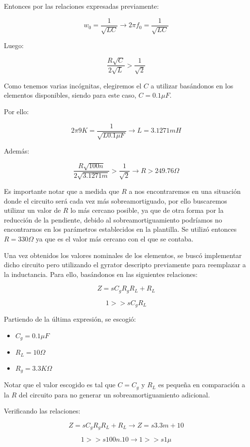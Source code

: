 Entonces por las relaciones expresadas previamente:

$$w_0=\frac{1}{\sqrt{LC}} \longrightarrow 2\pi f_0=\frac{1}{\sqrt{LC}}$$

Luego:

$$\frac{R\sqrt{C}}{2\sqrt{L}} > \frac{1}{\sqrt{2}}$$

Como tenemos varias incógnitas, elegiremos el $C$ a utilizar basándonos en los elementos disponibles, siendo para este caso,
$C=0.1\mu F$. 

Por ello:

$$2\pi 9K=\frac{1}{\sqrt{L0.1 \mu F}} \longrightarrow L = 3.1271 mH$$

Además:

$$\frac{R\sqrt{100n}}{2\sqrt{3.1271m}} > \frac{1}{\sqrt{2}} \longrightarrow R > 249.76 \Omega $$

Es importante notar que a medida que $R$ a nos encontraremos en una situación donde el circuito será
cada vez más sobreamortiguado, por ello buscaremos utilizar un valor de $R$ lo más cercano posible, ya que de otra forma
por la reducción de la pendiente, debido al sobreamortiguamiento podríamos no encontrarnos en los parámetros establecidos en la plantilla. Se utilizó entonces
$R= 330 \Omega$ ya que es el valor más cercano con el que se contaba.

Una vez obtenidos los valores nominales de los elementos, se buscó implementar dicho circuito pero utilizando el gyrator descripto previamente
para reemplazar a la inductancia. Para ello, basándonos 
en las siguientes relaciones:

$$Z=sC_gR_gR_L+R_L$$

$$1 >> sC_gR_L$$

Partiendo de la última expresión, se escogió:

\begin{itemize}
	\item $C_g=0.1 \mu F$
	\item $R_L=10 \Omega$
	\item $R_g=3.3K \Omega$
\end{itemize}

Notar que el valor escogido es tal que $C=C_g$ y $R_L$ es pequeña en comparación a la $R$ del circuito para no generar
un sobreamortiguamiento adicional.

Verificando las relaciones:

$$Z=sC_gR_gR_L+R_L \longrightarrow Z = s3.3m + 10$$

$$1 >> s100n.10 \longrightarrow 1  >> s1\mu$$

